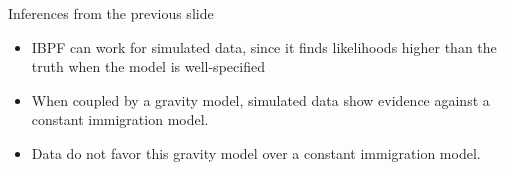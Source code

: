 \documentclass{beamer}
\begin{document}
\begin{frame}{Inferences from the previous slide}

  
\begin{itemize}
  \item
IBPF can work for simulated data, since it finds likelihoods higher than the truth when the model is well-specified

  \vspace{5mm}

  \item
    When coupled by a gravity model, simulated data show evidence against a constant immigration model.

    \vspace{5mm}
    
\item 
Data do not favor this gravity model over a constant immigration model.

    
\end{itemize}

\end{frame}
\end{document}
